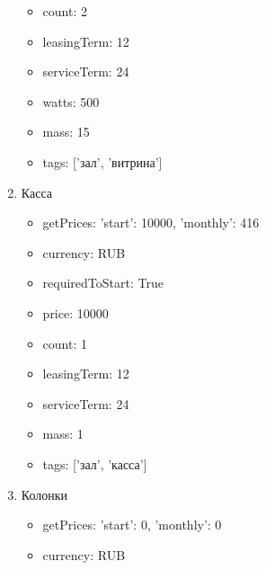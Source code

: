 \documentclass[a4paper,12pt]{article}
\begin{document}
\begin{enumerate}
\begin{itemize}
          \item count: 2
        
          \item leasingTerm: 12
        
          \item serviceTerm: 24
        
          \item watts: 500
        
          \item mass: 15
        
          \item tags: ['зал', 'витрина']
        
        \end{itemize}
      
      \item Касса
        \begin{itemize}
        
          \item getPrices: {'start': 10000, 'monthly': 416}
        
          \item currency: RUB
        
          \item requiredToStart: True
        
          \item price: 10000
        
          \item count: 1
        
          \item leasingTerm: 12
        
          \item serviceTerm: 24
        
          \item mass: 1
        
          \item tags: ['зал', 'касса']
        
        \end{itemize}
      
      \item Колонки
        \begin{itemize}
        
          \item getPrices: {'start': 0, 'monthly': 0}
        
          \item currency: RUB
        

\end{itemize}
\end{enumerate}
\end{document}
